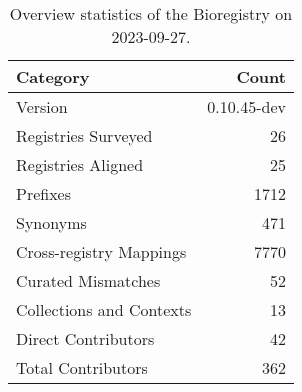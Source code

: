 \begin{table}
\caption{Overview statistics of the Bioregistry on 2023-09-27.}
\label{tab:bioregistry-summary}
\begin{tabular}{lr}
\toprule
Category & Count \\
\midrule
Version & 0.10.45-dev \\
Registries Surveyed & 26 \\
Registries Aligned & 25 \\
Prefixes & 1712 \\
Synonyms & 471 \\
Cross-registry Mappings & 7770 \\
Curated Mismatches & 52 \\
Collections and Contexts & 13 \\
Direct Contributors & 42 \\
Total Contributors & 362 \\
\bottomrule
\end{tabular}
\end{table}
